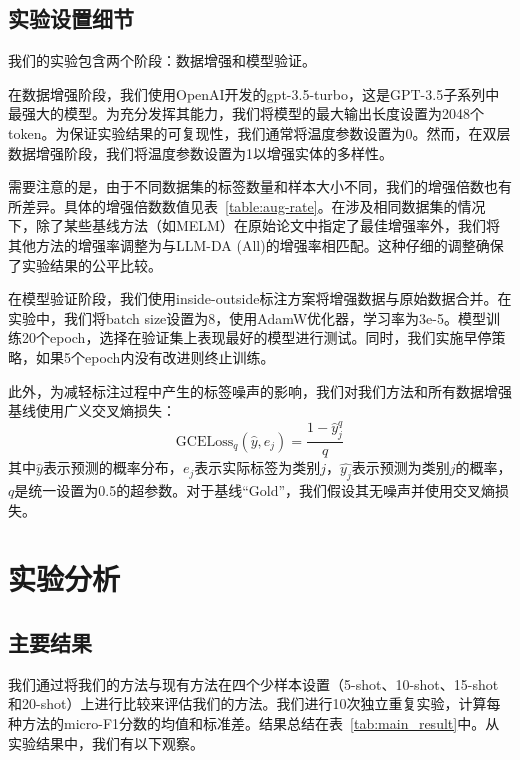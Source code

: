 \documentclass[supercite]{Experimental_Report}
\theoremstyle{definition}
\begin{document}
\subsection{实验设置细节}

我们的实验包含两个阶段：数据增强和模型验证。

在数据增强阶段，我们使用OpenAI开发的gpt-3.5-turbo，这是GPT-3.5子系列中最强大的模型\cite{instructGPT,GPT}。为充分发挥其能力，我们将模型的最大输出长度设置为2048个token。为保证实验结果的可复现性，我们通常将温度参数设置为0。然而，在双层数据增强阶段，我们将温度参数设置为1以增强实体的多样性。

需要注意的是，由于不同数据集的标签数量和样本大小不同，我们的增强倍数也有所差异。具体的增强倍数数值见表~\ref{table:aug-rate}。在涉及相同数据集的情况下，除了某些基线方法（如MELM）在原始论文中指定了最佳增强率外，我们将其他方法的增强率调整为与LLM-DA (All)的增强率相匹配。这种仔细的调整确保了实验结果的公平比较。

在模型验证阶段，我们使用inside-outside标注方案将增强数据与原始数据合并。在实验中，我们将batch size设置为8，使用AdamW优化器，学习率为3e-5。模型训练20个epoch，选择在验证集上表现最好的模型进行测试。同时，我们实施早停策略，如果5个epoch内没有改进则终止训练。

此外，为减轻标注过程中产生的标签噪声的影响，我们对我们方法和所有数据增强基线使用广义交叉熵损失\cite{GCELoss}：
\begin{equation*}
    \mathrm{GCELoss}_q(\hat{y}, e_j)=\frac{1-\hat{y}_j^q}{q}
\end{equation*}
其中$\hat{y}$表示预测的概率分布，$e_j$表示实际标签为类别$j$，$\hat{y_j}$表示预测为类别$j$的概率，$q$是统一设置为0.5的超参数。对于基线``Gold''，我们假设其无噪声并使用交叉熵损失。

\section{实验分析}

\subsection{主要结果}

我们通过将我们的方法与现有方法在四个少样本设置（5-shot、10-shot、15-shot和20-shot）上进行比较来评估我们的方法。我们进行10次独立重复实验，计算每种方法的micro-F1分数的均值和标准差。结果总结在表~\ref{tab:main_result}中。从实验结果中，我们有以下观察。
\end{document}
